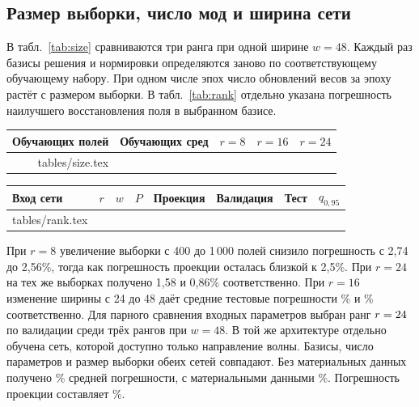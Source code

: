 \documentclass[11pt,a4paper]{article}
\makeatletter
\newenvironment{localtable}{\par\medskip\begingroup\centering\small\renewcommand{\arraystretch}{1.18}}{\par\endgroup\medskip}
\newcommand{\tabinput}[1]{\@@input #1.tex }
\makeatother
\begin{document}
\subsection*{Размер выборки, число мод и ширина сети}
В табл.~\ref{tab:size} сравниваются три ранга при одной ширине $w=48$. Каждый раз базисы решения и нормировки определяются заново по соответствующему обучающему набору. При одном числе эпох число обновлений весов за эпоху растёт с размером выборки. В табл.~\ref{tab:rank} отдельно указана погрешность наилучшего восстановления поля в выбранном базисе.
\begin{localtable}
\label{tab:size}
\begin{tabular}{rrrrr}\toprule Обучающих полей & Обучающих сред & $r=8$ & $r=16$ & $r=24$\\\midrule
\tabinput{tables/size}\bottomrule\end{tabular}
\end{localtable}
\begin{localtable}
\label{tab:rank}
\begin{tabular}{lrrr rrrr}\toprule
Вход сети & $r$ & $w$ & $P$ & Проекция & Валидация & Тест & $q_{0{,}95}$\\\midrule
\tabinput{tables/rank}\bottomrule\end{tabular}
\end{localtable}

При $r=8$ увеличение выборки с 400 до 1\,000 полей снизило погрешность с 2,74 до 2,56\%, тогда как погрешность проекции осталась близкой к 2,5\%. При $r=24$ на тех же выборках получено 1,58 и 0,86\% соответственно. При $r=16$ изменение ширины с 24 до 48 даёт средние тестовые погрешности \WidthSmall\% и \WidthLarge\% соответственно. Для парного сравнения входных параметров выбран ранг $r=24$ по валидации среди трёх рангов при $w=48$. В той же архитектуре отдельно обучена сеть, которой доступно только направление волны. Базисы, число параметров и размер выборки обеих сетей совпадают. Без материальных данных получено \BlindMean\% средней погрешности, с материальными данными \BestMean\%. Погрешность проекции составляет \BestFloor\%.

\clearpage
\end{document}
